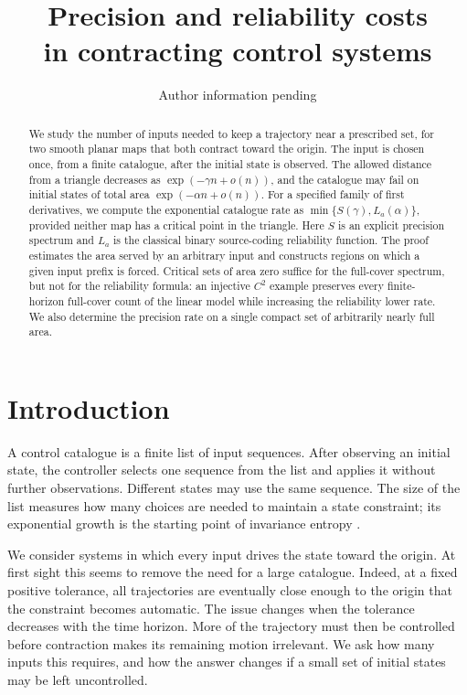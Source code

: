 \documentclass[11pt]{amsart}
\title[Precision and reliability costs]{Precision and reliability costs\\in contracting control systems}
\author{Author information pending}
\date{}
\theoremstyle{definition}
\theoremstyle{remark}
\numberwithin{equation}{section}
\begin{document}
\raggedbottom
\begin{abstract}
We study the number of inputs needed to keep a trajectory near a
prescribed set, for two smooth planar maps that both contract
toward the origin. The input is chosen once, from
a finite catalogue, after the initial state is observed. The allowed
distance from a triangle decreases as $\exp(-\gamma n+o(n))$, and
the catalogue may fail on initial states of total area
$\exp(-\alpha n+o(n))$. For a specified family of first derivatives,
we compute the exponential catalogue rate as
$\min\{S(\gamma),L_a(\alpha)\}$, provided neither map has a critical
point in the triangle. Here $S$ is an explicit precision spectrum
and $L_a$ is the classical binary source-coding reliability function.
The proof estimates the area served by an arbitrary input and
constructs regions on which a given input prefix is forced.
Critical sets of area zero suffice for the full-cover spectrum,
but not for the reliability formula: an injective $C^2$ example
preserves every finite-horizon full-cover count of the linear model
while increasing the reliability lower rate. We also determine the
precision rate on a single compact set of arbitrarily nearly full area.
\end{abstract}
\maketitle

\section{Introduction}
A control catalogue is a finite list of input sequences. After
observing an initial state, the controller selects one sequence
from the list and applies it without further observations. Different
states may use the same sequence. The size of the list measures
how many choices are needed to maintain a state constraint; its
exponential growth is the starting point of invariance entropy
\cite{CK2009,Kawan2013}.

We consider systems in which every input drives the state toward
the origin. At first sight this seems to remove the need for a large
catalogue. Indeed, at a fixed positive tolerance, all trajectories
are eventually close enough to the origin that the constraint
becomes automatic. The issue changes when the tolerance decreases
with the time horizon. More of the trajectory must then be controlled
before contraction makes its remaining motion irrelevant. We ask
how many inputs this requires, and how the answer changes if a
small set of initial states may be left uncontrolled.
\end{document}
